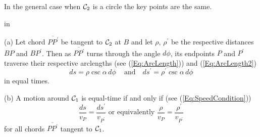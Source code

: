 \documentclass{ximera}
\newcommand{\pskip}{\vskip 0.1 in}
\begin{document}





In the general case when ${\cal C}_2$ is a circle the key points are the same. %

\pskip

(a) Let chord $\overline{PP^\prime}$ be tangent to ${\cal C}_2$ at $B$ and let $\rho$, $\rho^\prime$ be the respective distances $BP$ and $BP^\prime$. Then as $\overline{PP^\prime}$ turns through the angle $d\phi$, its endpoints $P$ and $P^\prime$ traverse their respective arclengths (see (\ref{Eq:ArcLength})) and (\ref{Eq:ArcLength2})
\begin{equation}
     ds = \rho \csc \alpha \, d\phi \,\,\,\,\, \text{ and } \,\,\,\, ds^\prime = \rho^\prime \csc \alpha \, d\phi  \label{Eq:ArcLengths2}
\end{equation}
in equal times.

(b) A motion around ${\cal C}_1$ is equal-time if and only if (see (\ref{Eq:SpeedCondition}))
\[
     \frac{ds}{v_P} = \frac{ds^\prime}{v_{P^\prime}}  \text{ or equivalently } \frac{\rho}{v_P} = \frac{\rho^\prime}{v_{P^\prime}} 
\] 
for all chords $\overline{PP^\prime}$ tangent to ${\cal C}_1$.


\begin{onlineOnly}
    \begin{center}
\end{center}
\end{onlineOnly}



\begin{onlineOnly}
    \begin{center}
\end{center}
\end{onlineOnly}
\end{document}
